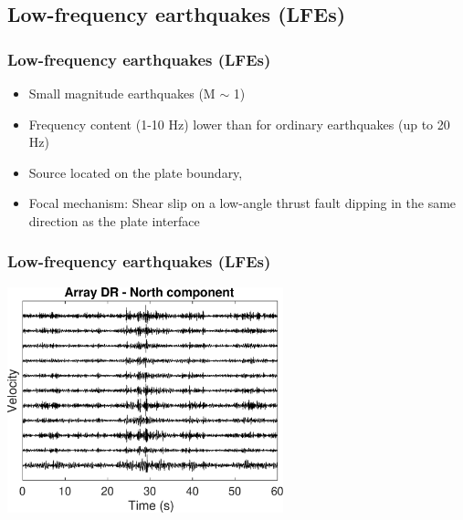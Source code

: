 \documentclass{beamer}
\begin{document}

	\subsection{Low-frequency earthquakes (LFEs)}

	\begin{frame}
		\frametitle{Low-frequency earthquakes (LFEs)}
		\begin{itemize}
			\item Small magnitude earthquakes (M $\sim$ 1)
			\item Frequency content (1-10 Hz) lower than for ordinary earthquakes (up to 20 Hz)
			\item Source located on the plate boundary,
			\item Focal mechanism: Shear slip on a low-angle thrust fault dipping in the same direction as the plate interface
		\end{itemize}
	\end{frame}

	\begin{frame}
		\frametitle{Low-frequency earthquakes (LFEs)}
		\begin{center}
			\includegraphics[trim={0cm 0cm 0cm 0cm}, clip, width=8cm]{ETS/LFE_NS.eps}
		\end{center}
	\end{frame}

\end{document}
